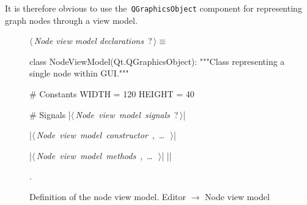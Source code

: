 \documentclass[%
    a4paper,    %
    justified,  %
    nobib,      %
    openany     %
]{tufte-book}
\makeatletter
\renewcommand{\label}[1]{\@tufte@label{##1}}%
\makeatother
\begin{document}
It is therefore obvious to use the~\verb=QGraphicsObject= component
for representing graph nodes through a view model.

\begin{figure}
\begin{flushleft} \small
\begin{minipage}{\linewidth}\label{scrap68}\raggedright\small
{} $\langle\,${\itshape Node view model declarations}\nobreak\ {\footnotesize {?}}$\,\rangle\equiv$
\vspace{-1ex}
\begin{pythoncode}
class NodeViewModel(Qt.QGraphicsObject):
    """Class representing a single node within GUI."""

    # Constants
    WIDTH = 120
    HEIGHT = 40

    # Signals
    |\hbox{$\langle\,${\itshape Node view model signals}\nobreak\ {\footnotesize ?}$\,\rangle$}|

    |\hbox{$\langle\,${\itshape Node view model constructor}\nobreak\ {\footnotesize {}, \ldots\ }$\,\rangle$}|

    |\hbox{$\langle\,${\itshape Node view model methods}\nobreak\ {\footnotesize {}, \ldots\ }$\,\rangle$}|
|\NWsep|
\end{pythoncode}
\vspace{1.5ex}
\footnotesize
\begin{list}{}{\setlength{\itemsep}{-\parsep}\setlength{\itemindent}{-\leftmargin}}
\item {\NWtxtMacroNoRef}.

\item{}
\end{list}
\end{minipage}\vspace{4ex}
\end{flushleft}
\caption{Definition of the node view model.
  \newline{}\newline{}Editor $\rightarrow$ Node view model}
\label{editor:lst:node-view-model}
\end{figure}
\end{document}

